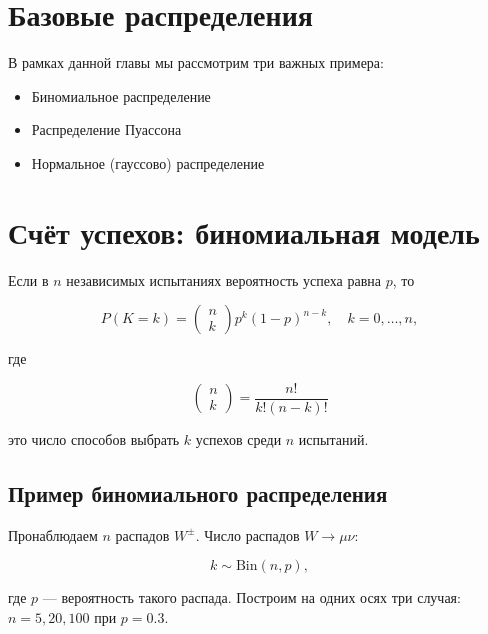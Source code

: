 \documentclass[
  russian,
  letterpaper,
]{scrbook}
\begin{document}
\section{Базовые
распределения}\label{ux431ux430ux437ux43eux432ux44bux435-ux440ux430ux441ux43fux440ux435ux434ux435ux43bux435ux43dux438ux44f}

В рамках данной главы мы рассмотрим три важных примера:

\begin{itemize}
\item
  Биномиальное распределение
\item
  Распределение Пуассона
\item
  Нормальное (гауссово) распределение
\end{itemize}

\section{Счёт успехов: биномиальная
модель}\label{ux441ux447ux451ux442-ux443ux441ux43fux435ux445ux43eux432-ux431ux438ux43dux43eux43cux438ux430ux43bux44cux43dux430ux44f-ux43cux43eux434ux435ux43bux44c}

Если в \(n\) независимых испытаниях вероятность успеха равна \(p\), то

\[P(K=k)=\begin{pmatrix} n\\k\end{pmatrix}p^k(1-p)^{n-k}, \quad k=0,\dots,n,\]

где

\[\begin{pmatrix} n\\k\end{pmatrix}=\frac{n!}{k!(n-k)!}\]

это число способов выбрать \(k\) успехов среди \(n\) испытаний.

\subsection{Пример биномиального
распределения}\label{ux43fux440ux438ux43cux435ux440-ux431ux438ux43dux43eux43cux438ux430ux43bux44cux43dux43eux433ux43e-ux440ux430ux441ux43fux440ux435ux434ux435ux43bux435ux43dux438ux44f}

Пронаблюдаем \(n\) распадов \(W^{\pm}\). Число распадов \(W\to\mu\nu\):

\[k\sim\mathrm{Bin}(n,p),\]

где \(p\) --- вероятность такого распада. Построим на одних осях три
случая: \(n=5,20,100\) при \(p=0.3\).
\end{document}
